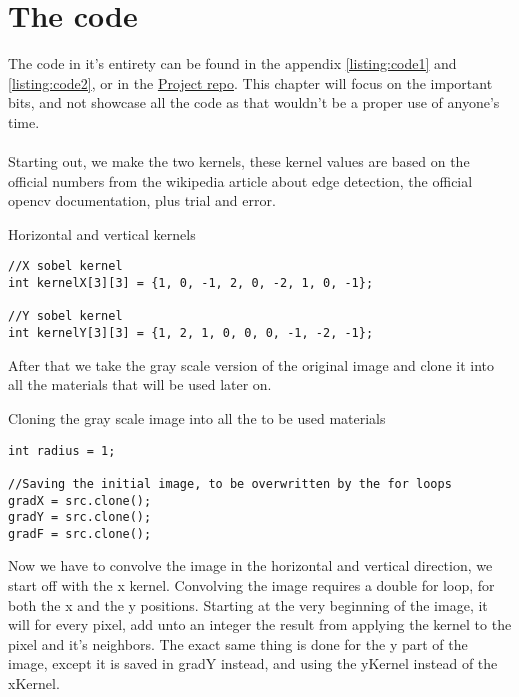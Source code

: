 \chapter{The code}
	The code in it's entirety can be found in the appendix \autoref{listing:code1} and \autoref{listing:code2}, or in the \href{https://github.com/totalfreak/opencvFilters}{\color{blue}Project repo}. This chapter will focus on the important bits, and not showcase all the code as that wouldn't be a proper use of anyone's time.\\
	\\
	Starting out, we make the two kernels, these kernel values are based on the official numbers from the wikipedia article about edge detection, the official opencv documentation, plus trial and error.

    \begin{listing}[H]
    	\caption{Horizontal and vertical kernels}
    	\label{listing:kernels}
    	\begin{verbatim}
//X sobel kernel
int kernelX[3][3] = {1, 0, -1, 2, 0, -2, 1, 0, -1};

//Y sobel kernel
int kernelY[3][3] = {1, 2, 1, 0, 0, 0, -1, -2, -1};
    	\end{verbatim}
    \end{listing}
	After that we take the gray scale version of the original image and clone it into all the materials that will be used later on. 
\begin{listing}[H]
	\caption{Cloning the gray scale image into all the to be used materials}
	\label{listing:matClone}
	\begin{verbatim}
int radius = 1;

//Saving the initial image, to be overwritten by the for loops
gradX = src.clone();
gradY = src.clone();
gradF = src.clone();
	\end{verbatim}
\end{listing}\newpage
Now we have to convolve the image in the horizontal and vertical direction, we start off with the x kernel. Convolving the image requires a double for loop, for both the x and the y positions. Starting at the very beginning of the image, it will for every pixel, add unto an integer the result from applying the kernel to the pixel and it's neighbors. The exact same thing is done for the y part of the image, except it is saved in gradY instead, and using the yKernel instead of the xKernel.
